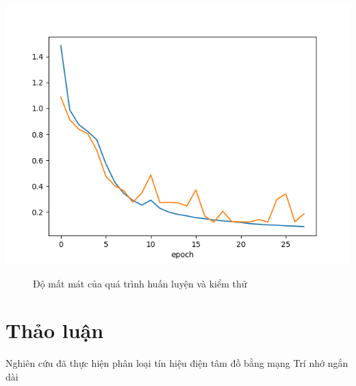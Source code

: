 \begin{center}
    \includegraphics[scale=.6]{image/chapter6/loss.png}
    \begin{figure}[htp]
    \begin{center}
    \end{center}
    \caption{Độ mất mát của quá trình huấn luyện và kiểm thử}
    \end{figure}
\end{center}

\section{Thảo luận}
Nghiên cứu đã thực hiện phân loại tín hiệu điện tâm đồ bằng mạng Trí nhớ ngắn dài 
